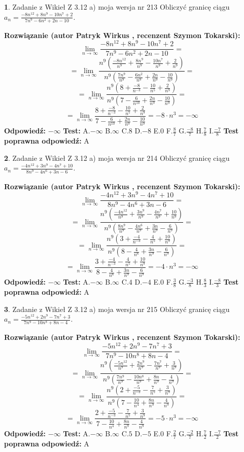 \documentclass[12pt, a4paper]{article}
\theoremstyle{definition} %
\newtheorem{zad}{}
\newcommand{\zadStart}[1]{\begin{zad}#1\newline}
\newcommand{\zadStop}{\end{zad}}
\newcommand{\rozwStart}[2]{\noindent \textbf{Rozwiązanie (autor #1 , recenzent #2): }\newline}
\newcommand{\rozwStop}{\newline}
\newcommand{\odpStart}{\noindent \textbf{Odpowiedź:}\newline}
\newcommand{\odpStop}{\newline}
\newcommand{\testStart}{\noindent \textbf{Test:}\newline}
\newcommand{\testStop}{\newline}
\newcommand{\kluczStart}{\noindent \textbf{Test poprawna odpowiedź:}\newline}
\newcommand{\kluczStop}{\newline}
\begin{document}
\zadStart{Zadanie z Wikieł Z 3.12 a) moja wersja nr 213}
Obliczyć granicę ciągu $a_{n}=\frac{-8n^{12}+8n^{9}-10n^{7}+2}{7n^{9}-6n^{2}+2n-10}$.
\zadStop
\rozwStart{Patryk Wirkus}{Szymon Tokarski}
$$\lim\limits_{n\to\infty}\frac{-8n^{12}+8n^{9}-10n^{7}+2}{7n^{9}-6n^{2}+2n-10}=$$
$$=\lim\limits_{n\to\infty}\frac{n^{9}\left(\frac{-8n^{12}}{n^{9}}+\frac{8n^{9}}{n^{9}}-\frac{10n^{7}}{n^{9}}+\frac{2}{n^{9}}\right)}{n^{9}\left(\frac{7n^{9}}{n^{9}}-\frac{6n^{2}}{n^{9}}+\frac{2n}{n^{9}}-\frac{10}{n^{9}}\right)}=$$
$$=\lim\limits_{n\to\infty}\frac{n^{9}\left(8+\frac{-8}{n^{-3}}-\frac{10}{n^{5}}+\frac{2}{n^{9}}\right)}
{n^{9}\left(7-\frac{6}{n^{10}}+\frac{2n}{n^{9}}-\frac{10}{n^{9}}\right)}=$$
$$=\lim\limits_{n\to\infty}\frac{8+\frac{-8}{n^{-3}}-\frac{10}{n^{5}}+\frac{2}{n^{9}}}{7-\frac{6}{n^{10}}+\frac{2n}{n^{9}}-\frac{10}{n^{9}}}=-8\cdot n^{3} = -\infty$$
\rozwStop
\odpStart
$-\infty$
\odpStop
\testStart
A.$-\infty$
B.$\infty$
C.$8$
D.$-8$
E.$0$
F.$\frac{8}{7}$
G.$\frac{-8}{7}$
H.$\frac{7}{8}$
I.$\frac{-7}{8}$
\testStop
\kluczStart
A
\kluczStop



\zadStart{Zadanie z Wikieł Z 3.12 a) moja wersja nr 214}
Obliczyć granicę ciągu $a_{n}=\frac{-4n^{12}+3n^{9}-4n^{7}+10}{8n^{9}-4n^{6}+3n-6}$.
\zadStop
\rozwStart{Patryk Wirkus}{Szymon Tokarski}
$$\lim\limits_{n\to\infty}\frac{-4n^{12}+3n^{9}-4n^{7}+10}{8n^{9}-4n^{6}+3n-6}=$$
$$=\lim\limits_{n\to\infty}\frac{n^{9}\left(\frac{-4n^{12}}{n^{9}}+\frac{3n^{9}}{n^{9}}-\frac{4n^{7}}{n^{9}}+\frac{10}{n^{9}}\right)}{n^{9}\left(\frac{8n^{9}}{n^{9}}-\frac{4n^{6}}{n^{9}}+\frac{3n}{n^{9}}-\frac{6}{n^{9}}\right)}=$$
$$=\lim\limits_{n\to\infty}\frac{n^{9}\left(3+\frac{-4}{n^{-3}}-\frac{4}{n^{5}}+\frac{10}{n^{9}}\right)}
{n^{9}\left(8-\frac{4}{n^{6}}+\frac{3n}{n^{9}}-\frac{6}{n^{9}}\right)}=$$
$$=\lim\limits_{n\to\infty}\frac{3+\frac{-4}{n^{-3}}-\frac{4}{n^{5}}+\frac{10}{n^{9}}}{8-\frac{4}{n^{6}}+\frac{3n}{n^{9}}-\frac{6}{n^{9}}}=-4\cdot n^{3} = -\infty$$
\rozwStop
\odpStart
$-\infty$
\odpStop
\testStart
A.$-\infty$
B.$\infty$
C.$4$
D.$-4$
E.$0$
F.$\frac{3}{8}$
G.$\frac{-3}{8}$
H.$\frac{8}{3}$
I.$\frac{-8}{3}$
\testStop
\kluczStart
A
\kluczStop



\zadStart{Zadanie z Wikieł Z 3.12 a) moja wersja nr 215}
Obliczyć granicę ciągu $a_{n}=\frac{-5n^{12}+2n^{9}-7n^{7}+3}{7n^{9}-10n^{8}+8n-4}$.
\zadStop
\rozwStart{Patryk Wirkus}{Szymon Tokarski}
$$\lim\limits_{n\to\infty}\frac{-5n^{12}+2n^{9}-7n^{7}+3}{7n^{9}-10n^{8}+8n-4}=$$
$$=\lim\limits_{n\to\infty}\frac{n^{9}\left(\frac{-5n^{12}}{n^{9}}+\frac{2n^{9}}{n^{9}}-\frac{7n^{7}}{n^{9}}+\frac{3}{n^{9}}\right)}{n^{9}\left(\frac{7n^{9}}{n^{9}}-\frac{10n^{8}}{n^{9}}+\frac{8n}{n^{9}}-\frac{4}{n^{9}}\right)}=$$
$$=\lim\limits_{n\to\infty}\frac{n^{9}\left(2+\frac{-5}{n^{-3}}-\frac{7}{n^{5}}+\frac{3}{n^{9}}\right)}
{n^{9}\left(7-\frac{10}{n^{4}}+\frac{8n}{n^{9}}-\frac{4}{n^{9}}\right)}=$$
$$=\lim\limits_{n\to\infty}\frac{2+\frac{-5}{n^{-3}}-\frac{7}{n^{5}}+\frac{3}{n^{9}}}{7-\frac{10}{n^{4}}+\frac{8n}{n^{9}}-\frac{4}{n^{9}}}=-5\cdot n^{3} = -\infty$$
\rozwStop
\odpStart
$-\infty$
\odpStop
\testStart
A.$-\infty$
B.$\infty$
C.$5$
D.$-5$
E.$0$
F.$\frac{2}{7}$
G.$\frac{-2}{7}$
H.$\frac{7}{2}$
I.$\frac{-7}{2}$
\testStop
\kluczStart
A
\kluczStop
\end{document}
